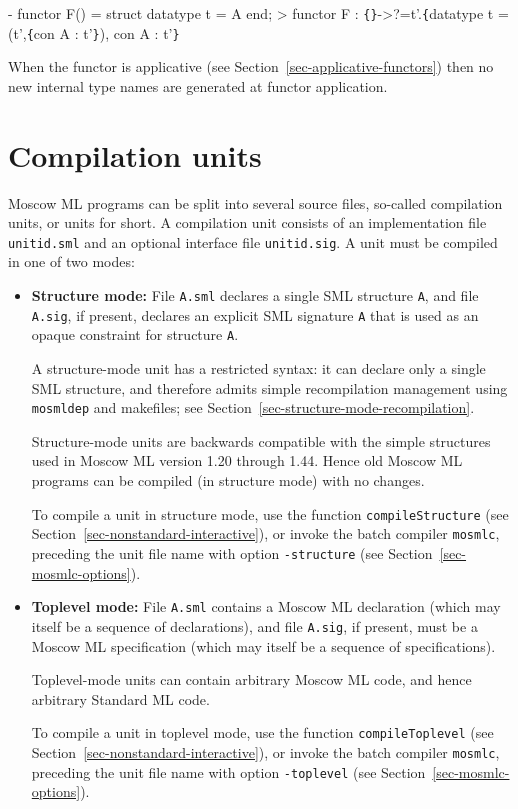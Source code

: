 \documentclass[fleqn,a4paper]{article}
\begin{document}
\begin{program}
- functor F() = struct datatype t = A end;
> functor F : \verb+{+\verb+}+->?=t'.\verb+{+datatype t = (t',\verb+{+con A : t'\verb+}+), con A : t'\verb+}+
\end{program}

\noindent When the functor is applicative (see
Section~\ref{sec-applicative-functors}) then no new internal type
names are generated at functor application.


\newpage
\section{Compilation units}
\label{sec-compilation-units}

Moscow ML programs can be split into several source files, so-called
compilation units, or units for short.  A compilation unit consists of
an implementation file \texttt{unitid.sml} and an optional interface
file \texttt{unitid.sig}.  A unit must be compiled in one of two modes:

\begin{itemize}
\item \textbf{Structure mode:} File \texttt{A.sml} declares a single
  SML structure \texttt{A}, and file \texttt{A.sig}, if present,
  declares an explicit SML signature \texttt{A} that is used as an
  opaque constraint for structure \texttt{A}.
  
  A structure-mode unit has a restricted syntax: it can declare only a
  single SML structure, and therefore admits simple recompilation
  management using \texttt{mosmldep} and makefiles; see
  Section~\ref{sec-structure-mode-recompilation}.
  
  Structure-mode units are backwards compatible with the simple
  structures used in Moscow ML version 1.20 through 1.44.  Hence old
  Moscow ML programs can be compiled (in structure mode) with no
  changes.
  
  To compile a unit in structure mode, use the function
  \texttt{compileStructure} (see
  Section~\ref{sec-nonstandard-interactive}), or invoke the batch
  compiler \texttt{mosmlc}, preceding the unit file name with option
  \texttt{-structure} (see Section~\ref{sec-mosmlc-options}).

  
\item \textbf{Toplevel mode:} File \texttt{A.sml} contains a Moscow ML
  declaration (which may itself be a sequence of declarations), and
  file \texttt{A.sig}, if present, must be a Moscow ML specification
  (which may itself be a sequence of specifications).

  Toplevel-mode units can contain arbitrary Moscow ML code, and hence
  arbitrary Standard ML code.
  
  To compile a unit in toplevel mode, use the function
  \texttt{compileToplevel} (see
  Section~\ref{sec-nonstandard-interactive}), or invoke the batch
  compiler \texttt{mosmlc}, preceding the unit file name with option
  \texttt{-toplevel} (see Section~\ref{sec-mosmlc-options}).

\end{itemize}
\end{document}
